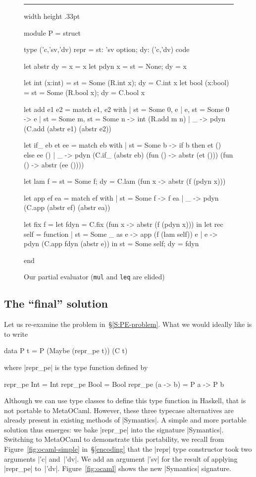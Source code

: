 \documentclass[preprint]{sigplanconf}
\newenvironment{floatrule}
    {\hrule width \hsize height .33pt \vspace{.5pc}}
    {\par\addvspace{1ex}}
\begin{document}
\begin{figure}
\begin{floatrule}
\begin{code}
module P = struct

  type ('c,'sv,'dv) repr = {st: 'sv option;
                            dy: ('c,'dv) code}

  let abstr {dy = x} = x
  let pdyn x = {st = None; dy = x}

  let int  (x:int)  = {st = Some (R.int x);
                       dy = C.int x}
  let bool (x:bool) = {st = Some (R.bool x);
                       dy = C.bool x}

  let add e1 e2 = match e1, e2 with
  | {st = Some 0}, e | e, {st = Some 0} -> e
  | {st = Some m}, {st = Some n} -> int (R.add m n)
  | _ -> pdyn (C.add (abstr e1) (abstr e2))

  let if_ eb et ee = match eb with
  | {st = Some b} -> if b then et () else ee ()
  | _ -> pdyn (C.if_ (abstr eb) 
                     (fun () -> abstr (et ()))
                     (fun () -> abstr (ee ())))

  let lam f =
  {st = Some f; 
   dy = C.lam (fun x -> abstr (f (pdyn x)))}

  let app ef ea = match ef with
  | {st = Some f} -> f ea
  | _ -> pdyn (C.app (abstr ef) (abstr ea))

  let fix f = 
    let fdyn = C.fix (fun x -> abstr (f (pdyn x)))
    in let rec self = function
       | {st = Some _} as e -> app (f (lam self)) e
       | e -> pdyn (C.app fdyn (abstr e))
       in {st = Some self; dy = fdyn}

end
\end{code}
\end{floatrule}
\caption{Our partial evaluator (\texttt{mul} and \texttt{leq} are elided)}
\label{fig:pe}
\end{figure}

\subsection{The ``final'' solution}
\label{S:PE-solution}
Let us re-examine the problem in~\S\ref{S:PE-problem}. What we
would ideally like is to write
\begin{code}
data P t = P (Maybe (repr_pe t)) (C t)
\end{code}
where |repr_pe| is the type function defined
by
\begin{code}
repr_pe Int      = Int
repr_pe Bool     = Bool
repr_pe (a -> b) = P a -> P b
\end{code}
Although we can use type classes to define this type function
in Haskell, that is not portable to MetaOCaml. However,
these three typecase alternatives are already present in existing
methods of |Symantics|.
A simple and more portable solution thus emerges: we bake |repr_pe| 
into the signature |Symantics|. Switching to MetaOCaml to demonstrate this
portability, we recall from Figure~\ref{fig:ocaml-simple} in~\S\ref{encoding} that the |repr| type
constructor took two arguments |'c| and~|'dv|. We add an argument
|'sv| for the result of applying |repr_pe| to~|'dv|.
Figure~\ref{fig:ocaml} shows the new |Symantics| signature.
\end{document}
